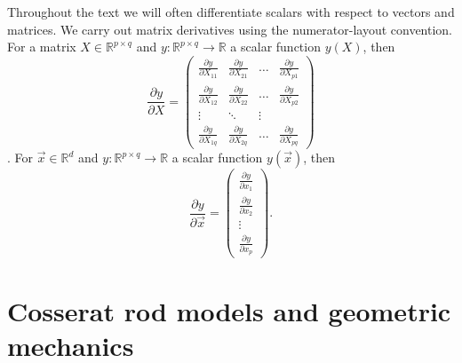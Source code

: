 Throughout the text we will often differentiate scalars with respect to vectors and matrices. We carry out matrix derivatives using the numerator-layout convention. For a matrix $X \in \mathbb{R}^{p \times q}$ and $y : \mathbb{R}^{p \times q} \to \mathbb{R}$ a scalar function $y(X)$, then
\begin{equation} \label{eq:numerator-layout convention}
	\frac{\partial y}{\partial X} = \begin{pmatrix}
		\frac{\partial y}{\partial X_{11}} & \frac{\partial y}{\partial X_{21}} & \dots & \frac{\partial y}{\partial X_{p1}} \\
		\frac{\partial y}{\partial X_{12}} & \frac{\partial y}{\partial X_{22}} & \dots & \frac{\partial y}{\partial X_{p2}} \\
		 \vdots & \ddots & \vdots \\
		 \frac{\partial y}{\partial X_{1q}} & \frac{\partial y}{\partial X_{2q}} & \dots & \frac{\partial y}{\partial X_{pq}}
	\end{pmatrix}
\end{equation}.
For $\vec{x} \in \mathbb{R}^d$ and $y : \mathbb{R}^{p \times q} \to \mathbb{R}$ a scalar function $y(\vec{x})$, then
\begin{equation}
	\frac{\partial y}{\partial \vec{x}} = \begin{pmatrix}
		\frac{\partial y}{\partial x_1} \\
		\frac{\partial y}{\partial x_2} \\
		\vdots \\
		\frac{\partial y}{\partial x_p}
	\end{pmatrix}.
\end{equation}


\chapter{Cosserat rod models and geometric mechanics} \label{ch:Cosserat rods}

